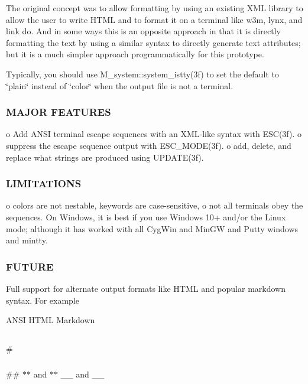 The original concept was to allow formatting by using an existing X\+ML library to allow the user to write H\+T\+ML and to format it on a terminal like w3m, lynx, and link do. And in some ways this is an opposite approach in that it is directly formatting the text by using a similar syntax to directly generate text attributes; but it is a much simpler approach programmatically for this prototype.

Typically, you should use M\+\_\+system\+::system\+\_\+istty(3f) to set the default to \char`\"{}plain\char`\"{} instead of \char`\"{}color\char`\"{} when the output file is not a terminal.

\subsubsection*{M\+A\+J\+OR F\+E\+A\+T\+U\+R\+ES}

o Add A\+N\+SI terminal escape sequences with an X\+M\+L-\/like syntax with E\+S\+C(3f). o suppress the escape sequence output with E\+S\+C\+\_\+\+M\+O\+D\+E(3f). o add, delete, and replace what strings are produced using U\+P\+D\+A\+T\+E(3f).

\subsubsection*{L\+I\+M\+I\+T\+A\+T\+I\+O\+NS}

o colors are not nestable, keywords are case-\/sensitive, o not all terminals obey the sequences. On Windows, it is best if you use Windows 10+ and/or the Linux mode; although it has worked with all Cyg\+Win and Min\+GW and Putty windows and mintty.

\subsubsection*{F\+U\+T\+U\+RE}

Full support for alternate output formats like H\+T\+ML and popular markdown syntax. For example

A\+N\+SI H\+T\+ML Markdown \subsection*{}

\# \subsubsection*{}

\#\# {\bfseries } $\ast$$\ast$ and $\ast$$\ast$ {\itshape } \+\_\+\+\_\+ and \+\_\+\+\_\+

